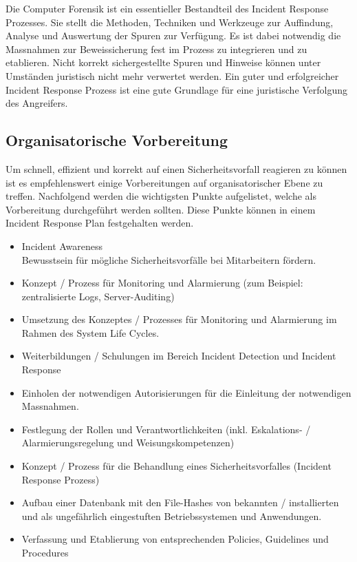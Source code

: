 Die Computer Forensik ist ein essentieller Bestandteil des Incident Response Prozesses. Sie stellt die Methoden, Techniken und Werkzeuge zur Auffindung, Analyse und Auswertung der Spuren zur Verfügung. Es ist dabei notwendig die Massnahmen zur Beweissicherung fest im Prozess zu integrieren und zu etablieren. Nicht korrekt sichergestellte Spuren und Hinweise können unter Umständen juristisch nicht mehr verwertet werden. Ein guter und erfolgreicher Incident Response Prozess ist eine gute Grundlage für eine juristische Verfolgung des Angreifers.

\subsection{Organisatorische Vorbereitung}
Um schnell, effizient und korrekt auf einen Sicherheitsvorfall reagieren zu können ist es empfehlenswert einige Vorbereitungen auf organisatorischer Ebene zu treffen.
Nachfolgend werden die wichtigsten Punkte aufgelistet, welche als Vorbereitung durchgeführt werden sollten. Diese Punkte können in einem Incident Response Plan festgehalten werden.

\begin{itemize}
\item Incident Awareness \\
Bewusstsein für mögliche Sicherheitsvorfälle bei Mitarbeitern fördern.
\item Konzept / Prozess für Monitoring und Alarmierung (zum Beispiel: zentralisierte Logs, Server-Auditing)
\item Umsetzung des Konzeptes / Prozesses für Monitoring und Alarmierung im Rahmen des System Life Cycles.
\item Weiterbildungen / Schulungen im Bereich Incident Detection und Incident Response
\item Einholen der notwendigen Autorisierungen für die Einleitung der notwendigen Massnahmen.
\item Festlegung der Rollen und Verantwortlichkeiten (inkl. Eskalations- / Alarmierungsregelung und Weisungskompetenzen)
\item Konzept / Prozess für die Behandlung eines Sicherheitsvorfalles (Incident Response Prozess)
\item Aufbau einer Datenbank mit den File-Hashes von bekannten / installierten und als ungefährlich eingestuften Betriebssystemen und Anwendungen.
\item Verfassung und Etablierung von entsprechenden Policies, Guidelines und Procedures
\end{itemize}

